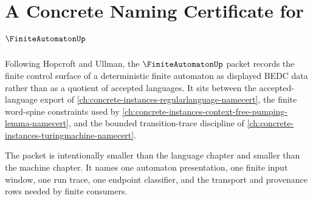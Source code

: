 \chapter{A Concrete Naming Certificate for $\FiniteAutomatonUp$}
\label{ch:concrete-instances-finite-automaton-namecert}

Following Hopcroft and Ullman, the $\FiniteAutomatonUp$ packet records the
finite control surface of a deterministic finite automaton as displayed BEDC
data rather than as a quotient of accepted languages. It sits between the
accepted-language export of
\autoref{ch:concrete-instances-regularlanguage-namecert}, the finite
word-spine constraints used by
\autoref{ch:concrete-instances-context-free-pumping-lemma-namecert}, and the
bounded transition-trace discipline of
\autoref{ch:concrete-instances-turingmachine-namecert}.

The packet is intentionally smaller than the language chapter and smaller than
the machine chapter. It names one automaton presentation, one finite input
window, one run trace, one endpoint classifier, and the transport and
provenance rows needed by finite consumers.

